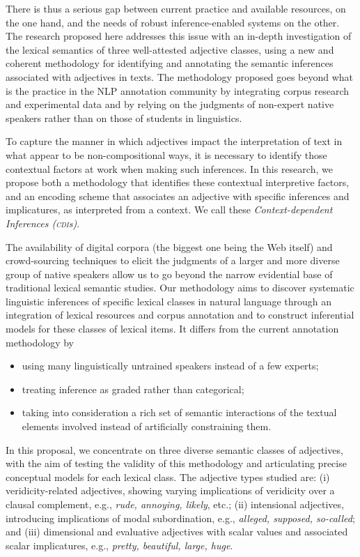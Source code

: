 \documentclass[10pt]{article}
\newcommand{\moveup}{\vspace*{-1.8mm}}
\begin{document}
There is thus a serious gap between current practice and available resources, on the one hand, and the needs of robust inference-enabled systems on the other. The research proposed here addresses this issue with an in-depth investigation of the lexical semantics of three well-attested adjective classes, using a new and coherent methodology for identifying and annotating the semantic inferences associated with adjectives in texts. The methodology proposed goes beyond what is the practice in the NLP annotation community by integrating corpus research and experimental data and by relying on the judgments of non-expert native speakers rather than on those of students in linguistics.
 
To capture the manner in which adjectives impact the interpretation of text in what appear to be  non-compositional ways, 
it is necessary to identify those contextual factors at work when making such inferences. In this research, we propose both a methodology that identifies these contextual interpretive factors, and an encoding scheme that associates an adjective with specific inferences and implicatures, as interpreted from a context. We call these {\it Context-dependent Inferences (\textsc{cdi}s)}. 

The availability of digital corpora (the biggest one being the Web itself) and crowd-sourcing techniques to elicit the judgments of a larger and more diverse group of native speakers allow us to go beyond the narrow evidential base of traditional lexical semantic studies. Our methodology aims to discover systematic linguistic inferences of specific lexical classes in natural language through an integration of lexical resources and corpus annotation and to construct  inferential models for these classes of lexical items. It differs from the current annotation methodology by
\begin{itemize}
\moveup
\item using many linguistically untrained speakers instead of a few experts;
\moveup
\item treating inference as graded rather than categorical;
\moveup
\item taking into consideration a rich set of semantic interactions of the textual elements involved instead of artificially constraining them.
\moveup
\end{itemize}


 
In this proposal, we concentrate on three diverse semantic classes of adjectives, with the aim of testing the validity of this methodology and articulating precise conceptual models for each lexical class. The adjective types studied are: (i) veridicity-related adjectives, showing varying implications of veridicity over a clausal complement, e.g., \textit{rude, annoying, likely}, etc.; (ii) intensional adjectives, introducing implications of modal subordination, e.g., \textit{alleged, supposed, so-called}; and (iii) dimensional and evaluative adjectives with scalar values and associated scalar implicatures, e.g., \textit{pretty, beautiful, large, huge}. 
\end{document}
